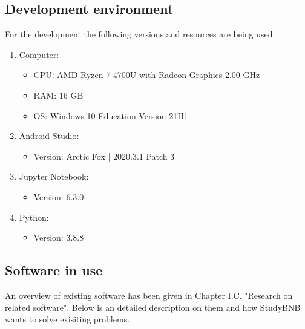 \documentclass[conference]{IEEEtran}
\begin{document}
\subsection{Development environment}

For the development the following versions and resources are being used:

\begin{enumerate}
\item Computer:
\begin{itemize}
\item CPU: AMD Ryzen 7 4700U with Radeon Graphics 2.00 GHz
\item RAM: 16 GB
\item OS: Windows 10 Education Version 21H1
\end{itemize}

\item Android Studio:
\begin{itemize}
\item Version: Arctic Fox | 2020.3.1 Patch 3
\end{itemize}

\item Jupyter Notebook:
\begin{itemize}
\item Version: 6.3.0
\end{itemize}

\item Python: 
\begin{itemize}
\item Version: 3.8.8
\end{itemize}

\end{enumerate}



\subsection{Software in use}

An overview of existing software has been given in Chapter I.C. "Research on related software". Below is an detailed description on them and how StudyBNB wants to solve exisiting problems.
\end{document}
